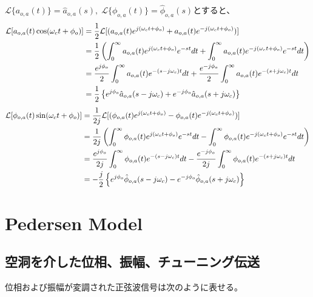 \documentclass[book]{jlreq}
\begin{document}
%
$\mathcal{L}\{a_{o,a}(t)\} = \hat{a}_{o,a}(s),\; \mathcal{L}\{\phi_{o,a}(t)\} = \hat{\phi}_{o,a}(s)$とすると、
%
\begin{align}
    \mathcal{L} [a_{o,a}(t)\cos(\omega_c t+\phi_o)]
     & = \frac{1}{2}\mathcal{L}[(a_{o,a}(t) e^{j(\omega_c t+\phi_o)}+a_{o,a}(t) e^{-j(\omega_c t+\phi_o)})]\notag \\
     & = \frac{1}{2}\left(\int_0^\infty a_{o,a}(t) e^{j(\omega_c t+\phi_o)} e^{-st} dt
    + \int_0^\infty a_{o,a}(t) e^{-j(\omega_c t+\phi_o)} e^{-st} dt \right)\notag                                 \\
     & = \frac{e^{j\phi_o}}{2}\int_0^\infty a_{o,a}(t) e^{-(s-j\omega_c) t} dt
    + \frac{e^{-j\phi_o}}{2}\int_0^\infty a_{o,a}(t) e^{-(s+j\omega_c) t} dt\notag                                \\
     & = \frac{1}{2}\left\{e^{j\phi_o}\hat{a}_{o,a}(s-j\omega_c) + e^{-j\phi_o}\hat{a}_{o,a}(s+j\omega_c)\right\}
\end{align}
%
\begin{align}
    \mathcal{L} [\phi_{o,a}(t)\sin(\omega_c t+\phi_o)]
     & = \frac{1}{2j}\mathcal{L}[(\phi_{o,a}(t) e^{j(\omega_c t+\phi_o)} - \phi_{o,a}(t) e^{-j(\omega_c t+\phi_o)})]\notag \\
     & = \frac{1}{2j}\left(\int_0^\infty \phi_{o,a}(t) e^{j(\omega_c t+\phi_o)} e^{-st} dt
    - \int_0^\infty \phi_{o,a}(t) e^{-j(\omega_c t+\phi_o)} e^{-st} dt \right)\notag                                       \\
     & = \frac{e^{j\phi_o}}{2j}\int_0^\infty \phi_{o,a}(t) e^{-(s-j\omega_c) t} dt
    - \frac{e^{-j\phi_o}}{2j}\int_0^\infty \phi_{o,a}(t) e^{-(s+j\omega_c) t} dt\notag                                     \\
     & = -\frac{j}{2}\left\{e^{j\phi_o}\hat{\phi}_{o,a}(s-j\omega_c) - e^{-j\phi_o} \hat{\phi}_{o,a}(s+j\omega_c)\right\}
\end{align}




\section{Pedersen Model}
\subsection{空洞を介した位相、振幅、チューニング伝送}

位相および振幅が変調された正弦波信号は次のように表せる。
\end{document}
